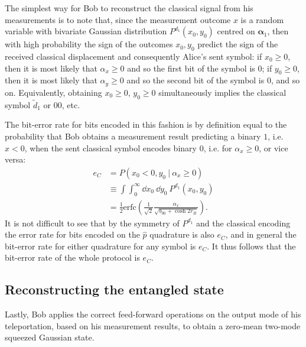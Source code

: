 \documentclass[%
 reprint,
 superscriptaddress,
 amsmath,
 amssymb,
 aps,
 pra,
]{revtex4-2}
\begin{document}
The simplest way for Bob to reconstruct the classical signal from his measurements is to note that, since the measurement outcome $x$ is a random variable with bivariate Gaussian distribution $P^{d_1}(x_0,y_0)$ centred on $\bm{\alpha}_1$, then with high probability the sign of the outcomes $x_0,y_0$ predict the sign of the received classical displacement and consequently Alice's sent symbol: if $x_0 \geq 0$, then it is most likely that $\alpha_x \geq 0$ and so the first bit of the symbol is $0$; if $y_0 \geq 0$, then it is most likely that $\alpha_y \geq 0$ and so the second bit of the symbol is $0$, and so on. Equivalently, obtaining $x_0 \geq 0$, $y_0\geq 0$ simultaneously implies the classical symbol $\tilde d_1$ or $00$, etc. 

The bit-error rate for bits encoded in this fashion is by definition equal to the probability that Bob obtains a measurement result predicting a binary $1$, i.e. $x < 0$, when the sent classical symbol encodes binary $0$, i.e. for $\alpha_x \geq 0$, or vice versa:
\begin{align}
    e_C &= P(x_0 < 0, y_0 \ | \ \alpha_x \geq 0) \\
    &\equiv \int \int_0^\infty \dd x_0 \ \dd y_0 \ P^{d_1}(x_0, y_0) \\
    &= \frac{1}{2} \mathrm{erfc}\left( \frac{1}{\sqrt{2}} \frac{\alpha_x}{\sqrt{b_{00} + \cosh 2r_B}} \right).
\end{align}
It is not difficult to see that by the symmetry of $P^{d_1}$ and the classical encoding the error rate for bits encoded on the $\hat p$ quadrature is also $e_C$, and in general the bit-error rate for either quadrature for any symbol is $e_C$. It thus follows that the bit-error rate of the whole protocol is $e_C$.

\subsection{Reconstructing the entangled state}
Lastly, Bob applies the correct feed-forward operations on the output mode of his teleportation, based on his measurement results, to obtain a zero-mean two-mode squeezed Gaussian state.
\end{document}
